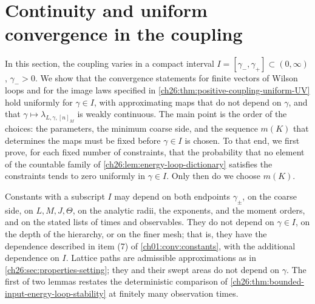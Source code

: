 \section{Continuity and uniform convergence in the coupling}\label{ch26:sec:compact-coupling-addendum}

In this section, the coupling varies in a compact interval $I=[\gamma_-,\gamma_+]\subset(0,\infty)$, $\gamma_->0$. We show that the convergence statements for finite vectors of Wilson loops and for the image laws specified in \cref{ch26:thm:positive-coupling-uniform-UV} hold uniformly for $\gamma\in I$, with approximating maps that do not depend on $\gamma$, and that $\gamma\mapsto\lambda_{L,\gamma,[n]_M}$ is weakly continuous. The main point is the order of the choices: the parameters, the minimum coarse side, and the sequence $m(K)$ that determines the maps must be fixed before $\gamma\in I$ is chosen. To that end, we first prove, for each fixed number of constraints, that the probability that no element of the countable family of \cref{ch26:lem:energy-loop-dictionary} satisfies the constraints tends to zero uniformly in $\gamma\in I$. Only then do we choose $m(K)$.

Constants with a subscript $I$ may depend on both endpoints $\gamma_\pm$, on the coarse side, on $L,M,J,\Theta$, on the analytic radii, the exponents, and the moment orders, and on the stated lists of times and observables. They do not depend on $\gamma\in I$, on the depth of the hierarchy, or on the finer mesh; that is, they have the dependence described in item (7) of \cref{ch01:conv:constants}, with the additional dependence on $I$. Lattice paths are admissible approximations as in \cref{ch26:sec:properties-setting}; they and their swept areas do not depend on $\gamma$. The first of two lemmas restates the deterministic comparison of \cref{ch26:thm:bounded-input-energy-loop-stability} at finitely many observation times.

